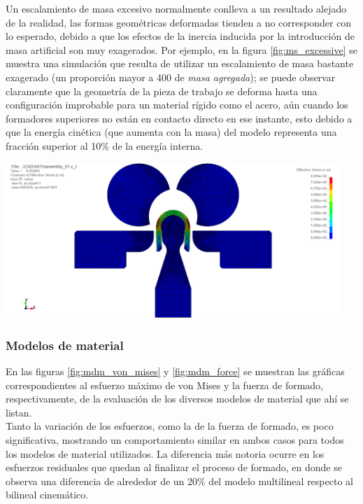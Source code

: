 Un escalamiento de masa excesivo normalmente conlleva a un resultado alejado de la realidad, las formas 
geométricas deformadas tienden a no corresponder con lo esperado, debido a que los efectos de la inercia 
inducida por la introducción de masa artificial son muy exagerados. Por ejemplo, en la figura 
\ref{fig:ms_excessive} se muestra una simulación que resulta de utilizar un escalamiento de masa bastante 
exagerado (un proporción mayor a 400 de \textit{masa agregada}); se puede observar claramente que la geometría 
de la pieza de trabajo se deforma hasta una configuración improbable para un material rígido como el acero, 
aún cuando los formadores superiores no están en contacto directo en ese instante, esto debido a que la 
energía cinética (que aumenta con la masa) del modelo representa una fracción superior al 10\% de la 
energía interna.\\

\begin{center}
\includegraphics[width=0.95\textwidth]{src/ch4/ms_excessive.png}
\label{fig:ms_excessive}
\end{center}

\subsubsection{Modelos de material}

En las figuras  \ref{fig:mdm_von_mises} y \ref{fig:mdm_force} se muestran las gráficas correspondientes 
al esfuerzo máximo de von Mises y la fuerza de formado, respectivamente, de la evaluación de los diversos 
modelos de material que ahí se listan.\\

Tanto la variación de los esfuerzos, como la de la fuerza de formado, es poco significativa, mostrando 
un comportamiento similar en ambos casos para todos los modelos de material utilizados. La 
diferencia más notoria ocurre en los esfuerzos residuales que quedan al finalizar el proceso 
de formado, en donde se observa una diferencia de alrededor de un 20\% del modelo multilineal 
respecto al bilineal cinemático.

